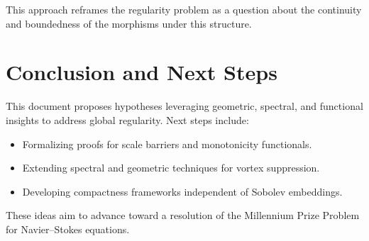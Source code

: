 \documentclass[12pt]{article}
\numberwithin{equation}{section}
\begin{document}
This approach reframes the regularity problem as a question about the continuity and boundedness of the morphisms under this structure.

\section{Conclusion and Next Steps}
This document proposes hypotheses leveraging geometric, spectral, and functional insights to address global regularity. Next steps include:
\begin{itemize}
    \item Formalizing proofs for scale barriers and monotonicity functionals.
    \item Extending spectral and geometric techniques for vortex suppression.
    \item Developing compactness frameworks independent of Sobolev embeddings.
\end{itemize}
These ideas aim to advance toward a resolution of the Millennium Prize Problem for Navier--Stokes equations.
\end{document}
